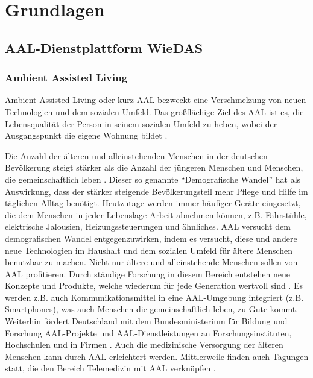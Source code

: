\chapter{Grundlagen}
\label{grundlagen}

\section{AAL-Dienstplattform WieDAS}

\subsection{Ambient Assisted Living}
\label{gru_aal}

Ambient Assisted Living oder kurz AAL bezweckt eine Verschmelzung von neuen Technologien und
dem sozialen Umfeld.
Das großflächige Ziel des AAL ist es, die Lebensqualität der Person in seinem sozialen Umfeld zu heben,
wobei der Ausgangspunkt die eigene Wohnung bildet \cite{aaldeu}.

Die Anzahl der älteren und alleinstehenden Menschen in der deutschen Bevölkerung steigt stärker
als die Anzahl der jüngeren Menschen und Menschen, die gemeinschaftlich leben \cite{aaldeu}.
Dieser so genannte ``Demografische Wandel'' hat als Auswirkung, dass der stärker steigende Bevölkerungsteil
mehr Pflege und Hilfe im täglichen Alltag benötigt.
Heutzutage werden immer häufiger Geräte eingesetzt, die dem Menschen in jeder Lebenslage Arbeit abnehmen können,
z.B. Fahrstühle, elektrische Jalousien, Heizungssteuerungen und ähnliches.
AAL versucht dem demografischen Wandel entgegenzuwirken, indem es versucht, diese und andere neue Technologien
im Haushalt und dem sozialen Umfeld für ältere Menschen benutzbar zu machen.
Nicht nur ältere und alleinstehende Menschen sollen von AAL profitieren.
Durch ständige Forschung in diesem Bereich entstehen neue Konzepte und Produkte, welche wiederum
für jede Generation wertvoll sind \cite{mtidw}.
Es werden z.B. auch Kommunikationsmittel in eine AAL-Umgebung integriert (z.B. Smartphones), was
auch Menschen die gemeinschaftlich leben, zu Gute kommt.
Weiterhin fördert Deutschland mit dem Bundesministerium für Bildung und Forschung AAL-Projekte und
AAL-Dienstleistungen an Forschungsinstituten, Hochschulen und in Firmen \cite{bmbf_aal}.
Auch die medizinische Versorgung der älteren Menschen kann durch AAL erleichtert werden.
Mittlerweile finden auch Tagungen statt, die den Bereich Telemedizin mit AAL verknüpfen \cite{aal_tele}.

